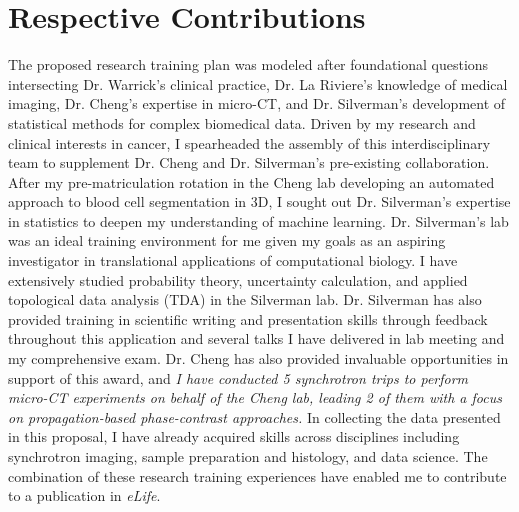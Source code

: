 \documentclass{NIHGrant}
\begin{document}
\part*{Respective Contributions}
The proposed research training plan was modeled after foundational questions intersecting Dr. Warrick's clinical practice, Dr. La Riviere's knowledge of medical imaging, Dr. Cheng's expertise in micro-CT, and Dr. Silverman's development of statistical methods for complex biomedical data. Driven by my research and clinical interests in cancer, I spearheaded the assembly of this interdisciplinary team to supplement Dr. Cheng and Dr. Silverman's pre-existing collaboration. After my pre-matriculation rotation in the Cheng lab developing an automated approach to blood cell segmentation in 3D, I sought out Dr. Silverman's expertise in statistics to deepen my understanding of machine learning. Dr. Silverman's lab was an ideal training environment for me given my goals as an aspiring investigator in translational applications of computational biology. I have extensively studied probability theory, uncertainty calculation, and applied topological data analysis (TDA) in the Silverman lab. Dr. Silverman has also provided training in scientific writing and presentation skills through feedback throughout this application and several talks I have delivered in lab meeting and my comprehensive exam. Dr. Cheng has also provided invaluable opportunities in support of this award, and \emph{I have conducted 5 synchrotron trips to perform micro-CT experiments on behalf of the Cheng lab, leading 2 of them with a focus on propagation-based phase-contrast approaches.} In collecting the data presented in this proposal, I have already acquired skills across disciplines including synchrotron imaging, sample preparation and histology, and data science. The combination of these research training experiences have enabled me to contribute to a publication in \textit{eLife}.
\end{document}
